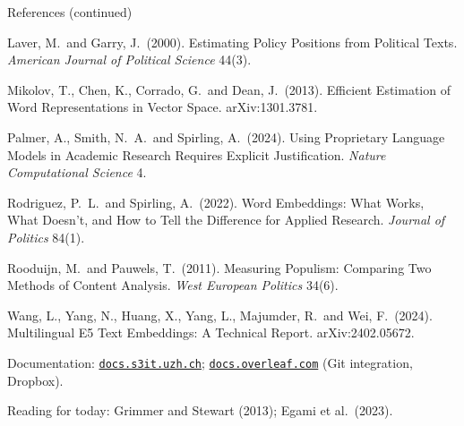 \documentclass[svgnames,x11names,dvipsnames]{beamer}
\newcommand{\chg}[1]{{\bfseries #1}}
\renewcommand{\chg}[1]{#1}
\begin{document}
\begin{frame}{\chg{References (continued)}}
\vspace{0.1cm}
\raggedright
{\scriptsize
Laver, M.\ and Garry, J.\ (2000). Estimating Policy Positions from Political Texts. \textit{American Journal of Political Science} 44(3).

\vspace{0.1cm}
Mikolov, T., Chen, K., Corrado, G.\ and Dean, J.\ (2013). Efficient Estimation of Word Representations in Vector Space. arXiv:1301.3781.

\vspace{0.1cm}
Palmer, A., Smith, N.\ A.\ and Spirling, A.\ (2024). Using Proprietary Language Models in Academic Research Requires Explicit Justification. \textit{Nature Computational Science} 4.

\vspace{0.1cm}
Rodriguez, P.\ L.\ and Spirling, A.\ (2022). Word Embeddings: What Works, What Doesn't, and How to Tell the Difference for Applied Research. \textit{Journal of Politics} 84(1).

\vspace{0.1cm}
Rooduijn, M.\ and Pauwels, T.\ (2011). Measuring Populism: Comparing Two Methods of Content Analysis. \textit{West European Politics} 34(6).

\vspace{0.1cm}
Wang, L., Yang, N., Huang, X., Yang, L., Majumder, R.\ and Wei, F.\ (2024). Multilingual E5 Text Embeddings: A Technical Report. arXiv:2402.05672.

\vspace{0.1cm}
Documentation: \href{https://docs.s3it.uzh.ch}{\texttt{docs.s3it.uzh.ch}}; \href{https://docs.overleaf.com}{\texttt{docs.overleaf.com}} (Git integration, Dropbox).
}

\vspace{0.3cm}
{\footnotesize Reading for today: Grimmer and Stewart (2013); Egami et al.\ (2023).}
\end{frame}
\end{document}
